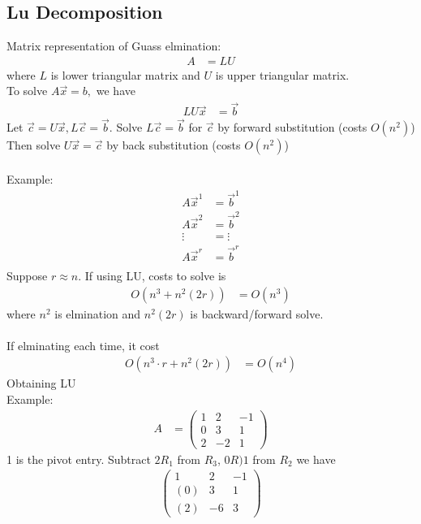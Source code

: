 \documentclass[11pt,oneside]{book}
\theoremstyle{break}
\theoremstyle{break}
\newcommand{\example}{\color{purple}Example: \color{black}}
\begin{document}
  \subsection[Lu Decomposition]{Lu Decomposition}
  Matrix representation of Guass elmination: \begin{align*}
  A&=LU
  \end{align*}
  where $L$ is lower triangular matrix and $U$ is upper triangular matrix. \\
  To solve $A\vec{x}=b,$ we have \begin{align*}
  LU\vec{x}&=\vec{b}
\end{align*}   
Let $\vec{c}=U\vec{x},L\vec{c}=\vec{b}.$ Solve $L\vec{c}=\vec{b}$ for $\vec{c}$ by forward substitution (costs $O(n^2)$)\\
Then solve $U\vec{x}=\vec{c}$ by back substitution (costs $O(n^2)$)\\
\hfill\\
\example \begin{align*}
A\vec{x}^{1}&=\vec{b}^{1}\\
A\vec{x}^{2}&=\vec{b}^{2}\\
\vdots&=\vdots\\
A\vec{x}^{r}&=\vec{b}^{r}\\
\end{align*}
Suppose $r\approx n$. If using LU, costs to solve is \begin{align*}
O(n^3+n^2(2r))&=O(n^3)
\end{align*}
where $n^2$ is elmination and $n^2(2r)$ is backward/forward solve.\\
\hfill\\
If elminating each time, it cost \begin{align*}
O(n^3\cdot r+n^2(2r))&=O(n^4)
\end{align*}
Obtaining LU \\
\example \begin{align*}
A&=\begin{pmatrix}
1&2&-1\\
0&3&1\\
2&-2&1
\end{pmatrix}
\end{align*}
1 is the pivot entry. Subtract $2R_1$ from $R_3$, $0R)1$ from $R_2$ we have \begin{align*}
\begin{pmatrix}
1&2&-1\\
(0)&3&1\\
(2)&-6&3
\end{pmatrix}
\end{align*}
\end{document}
